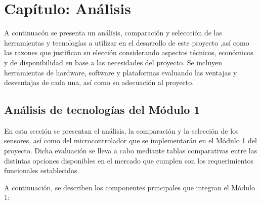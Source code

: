 
\section{Capítulo: Análisis}
\label{sec:cap5}
A continuacón se presenta un análisis, comparación y seleccción de las 
herramientas y tecnologías a  utilizar en el desarrollo de este proyecto 
,así como las razones que justifican su elección considerando aspectos 
técnicos, económicos y de disponibilidad en base a las necesidades del 
proyecto. Se incluyen herramientas de hardware, software y plataformas 
evaluando las ventajas y desventajas
de cada una, así como su adecuación al proyecto.
\subsection{Análisis de tecnologías del Módulo 1}
\label{sec:mod1}
En esta sección se presentan el análisis, la comparación y la selección de los sensores, 
así como del microcontrolador que se implementarán en el Módulo 1 del proyecto. 
Dicha evaluación se lleva a cabo mediante tablas comparativas entre 
las distintas opciones disponibles en el mercado que cumplen con los
requerimientos funcionales establecidos.

A continuación, se describen los componentes principales que integran el Módulo 1:
